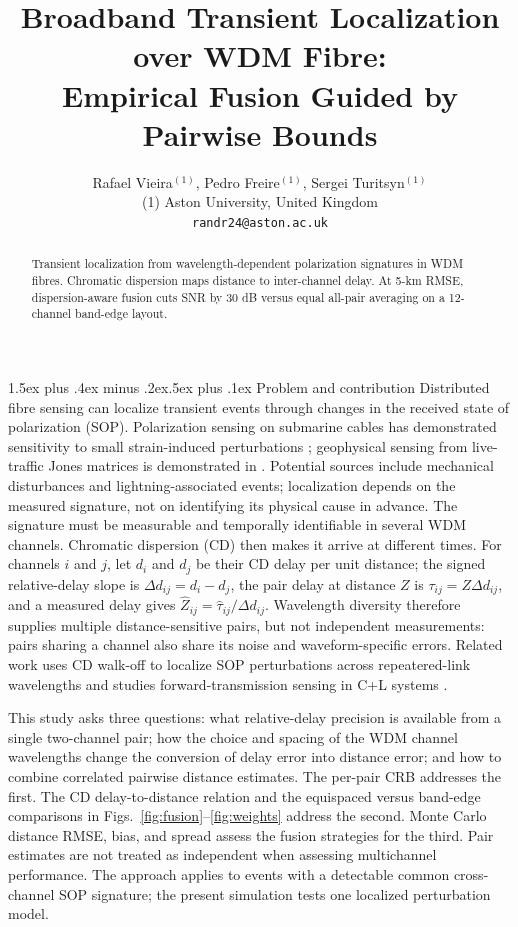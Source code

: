 \documentclass[10pt]{article}
\title{\vspace{-1.2em}\bfseries Broadband Transient Localization over WDM Fibre:\\
Empirical Fusion Guided by Pairwise Bounds}
\author{Rafael Vieira$^{(1)}$, Pedro Freire$^{(1)}$, Sergei Turitsyn$^{(1)}$\\[3pt]
\small (1) Aston University, United Kingdom\\
\small \texttt{randr24@aston.ac.uk}}
\date{}
\makeatletter
\renewcommand\section{\@startsection{section}{1}{\z@}%
  {1.5ex plus .4ex minus .2ex}{.5ex plus .1ex}%
  {\normalfont\large\bfseries}}
\makeatother
\begin{document}
\maketitle
\vspace{-2.1em}

\begin{abstract}
Transient localization from wavelength-dependent polarization signatures in WDM fibres. Chromatic dispersion maps distance to inter-channel delay. At 5-km RMSE, dispersion-aware fusion cuts SNR by 30 dB versus equal all-pair averaging on a 12-channel band-edge layout.
\end{abstract}

\section{Problem and contribution}
Distributed fibre sensing can localize transient events through changes in the received state of polarization (SOP). Polarization sensing on submarine cables has demonstrated sensitivity to small strain-induced perturbations \cite{mecozzi2021}; geophysical sensing from live-traffic Jones matrices is demonstrated in \cite{mecozzi2025}. Potential sources include mechanical disturbances and lightning-associated events; localization depends on the measured signature, not on identifying its physical cause in advance. The signature must be measurable and temporally identifiable in several WDM channels. Chromatic dispersion (CD) then makes it arrive at different times. For channels $i$ and $j$, let $d_i$ and $d_j$ be their CD delay per unit distance; the signed relative-delay slope is $\Delta d_{ij}=d_i-d_j$, the pair delay at distance $Z$ is $\tau_{ij}=Z\Delta d_{ij}$, and a measured delay gives $\hat Z_{ij}=\hat\tau_{ij}/\Delta d_{ij}$. Wavelength diversity therefore supplies multiple distance-sensitive pairs, but not independent measurements: pairs sharing a channel also share its noise and waveform-specific errors. Related work uses CD walk-off to localize SOP perturbations across repeatered-link wavelengths \cite{vaskinn2025} and studies forward-transmission sensing in C+L systems \cite{tang2024}.

This study asks three questions: what relative-delay precision is available from a single two-channel pair; how the choice and spacing of the WDM channel wavelengths change the conversion of delay error into distance error; and how to combine correlated pairwise distance estimates. The per-pair CRB addresses the first. The CD delay-to-distance relation and the equispaced versus band-edge comparisons in Figs.~\ref{fig:fusion}--\ref{fig:weights} address the second. Monte Carlo distance RMSE, bias, and spread assess the fusion strategies for the third. Pair estimates are not treated as independent when assessing multichannel performance. The approach applies to events with a detectable common cross-channel SOP signature; the present simulation tests one localized perturbation model.
\end{document}
